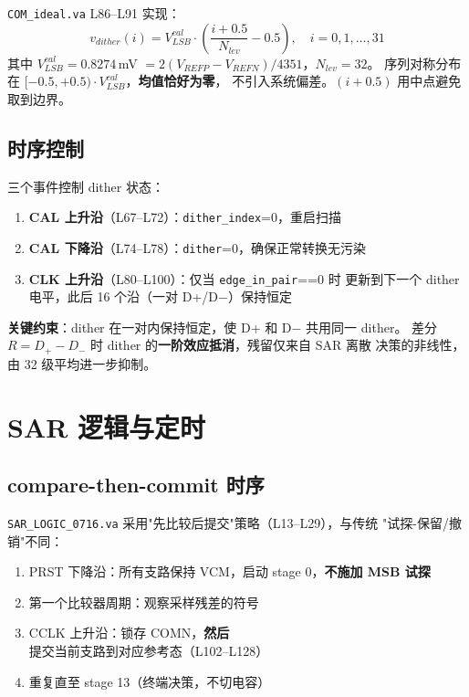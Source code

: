 \documentclass[UTF8,a4paper,11pt,twoside]{ctexrep}
\begin{document}
\texttt{COM\_ideal.va} L86--L91 实现：
\[
\boxed{v_{dither}(i) = V_{LSB}^{cal}\cdot\!\left(\frac{i+0.5}{N_{lev}}-0.5\right),\quad
i=0,1,\dots,31}
\]
其中 $V_{LSB}^{cal}=0.8274$\,mV $=2(V_{REFP}-V_{REFN})/4351$，$N_{lev}=32$。
序列对称分布在 $[-0.5,+0.5)\cdot V_{LSB}^{cal}$，\textbf{均值恰好为零}，
不引入系统偏差。$(i+0.5)$ 用中点避免取到边界。

\section{时序控制}

三个事件控制 dither 状态：

\begin{enumerate}
\item \textbf{CAL 上升沿}（L67--L72）：\texttt{dither\_index}=0，重启扫描
\item \textbf{CAL 下降沿}（L74--L78）：\texttt{dither}=0，确保正常转换无污染
\item \textbf{CLK 上升沿}（L80--L100）：仅当 \texttt{edge\_in\_pair}==0 时
      更新到下一个 dither 电平，此后 16 个沿（一对 D+/D$-$）保持恒定
\end{enumerate}

\textbf{关键约束}：dither 在一对内保持恒定，使 D+ 和 D$-$ 共用同一 dither。
差分 $R=D_+-D_-$ 时 dither 的\textbf{一阶效应抵消}，残留仅来自 SAR 离散
决策的非线性，由 32 级平均进一步抑制。

\chapter{SAR 逻辑与定时}

\section{compare-then-commit 时序}

\texttt{SAR\_LOGIC\_0716.va} 采用"先比较后提交"策略（L13--L29），与传统
"试探-保留/撤销"不同：

\begin{enumerate}
\item PRST 下降沿：所有支路保持 VCM，启动 stage 0，\textbf{不施加 MSB 试探}
\item 第一个比较器周期：观察采样残差的符号
\item CCLK 上升沿：锁存 COMN，\textbf{然后}提交当前支路到对应参考态（L102--L128）
\item 重复直至 stage 13（终端决策，不切电容）
\end{enumerate}
\end{document}
